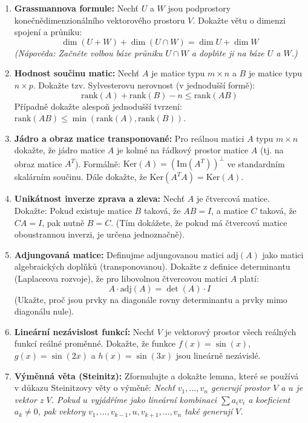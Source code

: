 \documentclass[a4paper,11pt]{article}
\begin{document}
\begin{enumerate}
    \item \textbf{Grassmannova formule:}
    Nechť $U$ a $W$ jsou podprostory konečnědimenzionálního vektorového prostoru $V$. Dokažte větu o dimenzi spojení a průniku:
    $$ \dim(U + W) + \dim(U \cap W) = \dim U + \dim W $$
    \textit{(Nápověda: Začněte volbou báze průniku $U \cap W$ a doplňte ji na báze $U$ a $W$.)}

    \item \textbf{Hodnost součinu matic:}
    Nechť $A$ je matice typu $m \times n$ a $B$ je matice typu $n \times p$. Dokažte tzv. Sylvesterovu nerovnost (v jednodušší formě):
    $$ \text{rank}(A) + \text{rank}(B) - n \le \text{rank}(AB) $$
    Případně dokažte alespoň jednodušší tvrzení: $\text{rank}(AB) \le \min(\text{rank}(A), \text{rank}(B))$.

    \item \textbf{Jádro a obraz matice transponované:}
    Pro reálnou matici $A$ typu $m \times n$ dokažte, že jádro matice $A$ je kolmé na řádkový prostor matice $A$ (tj. na obraz matice $A^T$). Formálně: $\text{Ker}(A) = (\text{Im}(A^T))^\perp$ ve standardním skalárním součinu.
    Dále dokažte, že $\text{Ker}(A^T A) = \text{Ker}(A)$.

    \item \textbf{Unikátnost inverze zprava a zleva:}
    Nechť $A$ je čtvercová matice. Dokažte: Pokud existuje matice $B$ taková, že $AB=I$, a matice $C$ taková, že $CA=I$, pak nutně $B=C$. (Tím dokážete, že pokud má čtvercová matice oboustrannou inverzi, je určena jednoznačně).

    \item \textbf{Adjungovaná matice:}
    Definujme adjungovanou matici $\text{adj}(A)$ jako matici algebraických doplňků (transponovanou). Dokažte z definice determinantu (Laplaceova rozvoje), že pro libovolnou čtvercovou matici $A$ platí:
    $$ A \cdot \text{adj}(A) = \det(A) \cdot I $$
    (Ukažte, proč jsou prvky na diagonále rovny determinantu a prvky mimo diagonálu nule).

    \item \textbf{Lineární nezávislost funkcí:}
    Nechť $V$ je vektorový prostor všech reálných funkcí reálné proměnné. Dokažte, že funkce $f(x) = \sin(x)$, $g(x) = \sin(2x)$ a $h(x) = \sin(3x)$ jsou lineárně nezávislé.

    \item \textbf{Výměnná věta (Steinitz):}
    Zformulujte a dokažte lemma, které se používá v důkazu Steinitzovy věty o výměně:
    \textit{Nechť $v_1, \dots, v_n$ generují prostor $V$ a $u$ je vektor z $V$. Pokud $u$ vyjádříme jako lineární kombinaci $\sum a_i v_i$ a koeficient $a_k \neq 0$, pak vektory $v_1, \dots, v_{k-1}, u, v_{k+1}, \dots, v_n$ také generují $V$.}


\end{enumerate}
\end{document}
